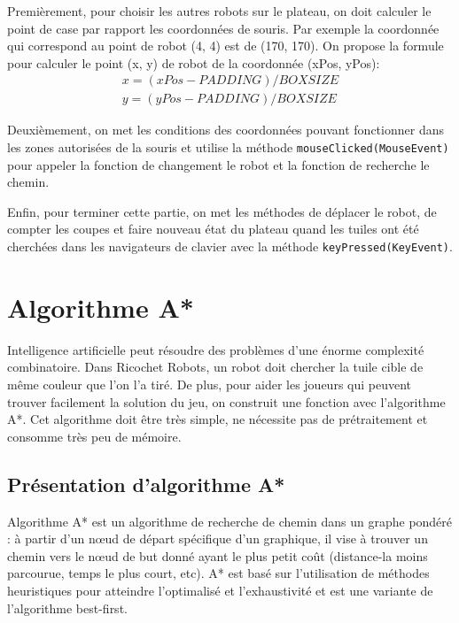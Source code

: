 \documentclass[12pt, pdflatex]{article}
\begin{document}
        Premièrement, pour choisir les autres robots sur le plateau, on doit calculer le point de case par rapport les coordonnées de souris. Par exemple la coordonnée qui correspond au point de robot (4, 4) est de (170, 170). On propose la formule pour calculer le point (x, y) de robot de la coordonnée (xPos, yPos):
        \begin{align*}
            x = (xPos - PADDING) / BOXSIZE \\ 
            y = (yPos - PADDING) / BOXSIZE
        \end{align*}

        Deuxièmement, on met les conditions des coordonnées pouvant fonctionner dans les zones autorisées de la souris et utilise la méthode \texttt{mouseClicked(MouseEvent)} pour appeler la fonction de changement le robot et la fonction de recherche le chemin.

        Enfin, pour terminer cette partie, on met les méthodes de déplacer le robot, de compter les coupes et faire nouveau état du plateau quand les tuiles ont été cherchées dans les navigateurs de clavier avec la méthode \texttt{keyPressed(KeyEvent)}.
        



\pagebreak

\section{Algorithme A*}
Intelligence artificielle peut résoudre des problèmes d'une énorme complexité combinatoire. Dans Ricochet Robots, un robot doit chercher la tuile cible de même couleur que l'on l'a tiré. De plus, pour aider les joueurs qui peuvent trouver facilement la solution du jeu, on construit une fonction avec l'algorithme A*. Cet algorithme doit être très simple, ne nécessite pas de prétraitement et consomme très peu de mémoire.
    
    \subsection{Présentation d'algorithme A*}
    Algorithme A*\cite{wikialgo} est un algorithme de recherche de chemin dans un graphe pondéré : à partir d'un nœud de départ spécifique d'un graphique, il vise à trouver un chemin vers le nœud de but donné ayant le plus petit coût (distance-la moins parcourue, temps le plus court, etc). A* est basé sur l'utilisation de méthodes heuristiques pour atteindre l'optimalisé et l'exhaustivité et est une variante de l'algorithme best-first.
\end{document}
